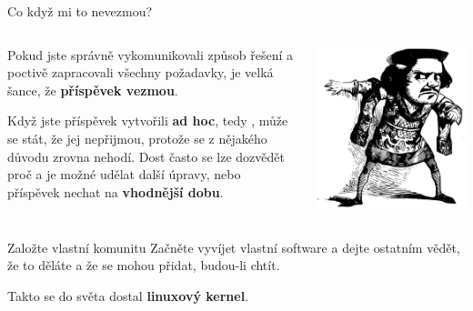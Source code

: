 \documentclass[11pt]{beamer}
\begin{document}
\begin{frame}{Co když mi to nevezmou?}
	\begin{columns}[T]
		\begin{column}{0.5\textwidth}
			Pokud jste správně vykomunikovali způsob řešení a poctivě zapracovali všechny požadavky, je velká šance, že \textbf{příspěvek vezmou}.
			
			Když jste příspěvek vytvořili \textbf{ad hoc}, tedy , může se stát, že jej nepřijmou, protože se z nějakého důvodu zrovna nehodí. Dost často se lze dozvědět proč a je možné udělat další úpravy, nebo příspěvek nechat na \textbf{vhodnější dobu}.
		\end{column}
		\begin{column}{0.5\textwidth}
			\includegraphics[width=\textwidth]{images/refuse.png}
		\end{column}
		\end{columns}	
\end{frame}	

\begin{frame}{Založte vlastní komunitu}
	Začněte vyvíjet vlastní software a dejte ostatním vědět, že to děláte a že se mohou přidat, budou-li chtít.
	
	Takto se do světa dostal \textbf{linuxový kernel}.
\end{frame}	
\end{document}
